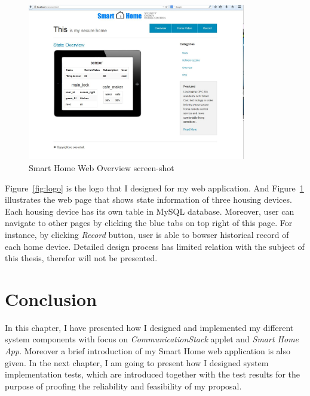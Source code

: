 \begin{figure}[!htb]
	\centering
	\includegraphics[width=0.85\textwidth]{Images/design/overview.jpg}
		\caption{Smart Home Web Overview screen-shot}
	\label{fig:smart-home-frontpage}
\end{figure}

Figure~\ref{fig:logo} is the logo that I designed for my web application. And Figure~\ref{fig:smart-home-frontpage} illustrates the web page that shows state information of three housing devices. Each housing device has its own table in MySQL database. Moreover, user can navigate to other pages by clicking the blue tabs on top right of this page. For instance, by clicking \emph{Record} button, user is able to bowser historical record of each home device. 
Detailed design process has limited relation with the subject of this thesis, therefor will not be presented.

\section{Conclusion}

In this chapter, I have presented how I designed and implemented my different system components with  focus on \emph{CommunicationStack} applet and \emph{Smart Home App}. Moreover a brief introduction of my Smart Home web application is also given. In the next chapter, I am going to present how I designed system implementation tests, which are introduced together with  the test results for the purpose of proofing the reliability and feasibility of my proposal.
